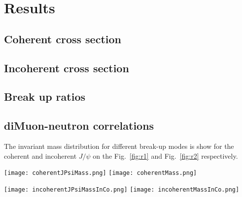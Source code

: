 \chapter{Results} 
  \section{Coherent cross section}
  \section{Incoherent cross section}
  \section{Break up ratios}
  \section{diMuon-neutron correlations}
The invariant mass distribution for different break-up modes is show for the coherent and incoherent $J/\psi$ on the Fig.~\ref{fig:r1} and Fig.~\ref{fig:r2} respectively. 
\begin{figure*}[!Hhtb]
  \begin{center}
    \texttt{[image: coherentJPsiMass.png]}
    \texttt{[image: coherentMass.png]}
    \caption{
      \label{fig:r1}  
      Invariant mass spectrum of the opposite signs di-muons originating from the coherent $J/\psi$ for $X_{n}0_{n}$ breakup mode for two invariant mass regions.  
    }
  \end{center}
\end{figure*}

\begin{figure*}[!Hhtb]
  \begin{center}
    \texttt{[image: incoherentJPsiMassInCo.png]}
        \texttt{[image: incoherentMassInCo.png]}


             \caption{
    \label{fig:r2}  
     Invariant mass spectrum of the opposite signs di-muons originating from the incoherent $J/\psi$  for $X_{n}0_{n}$ breakup mode for two invariant mass regions.   
        }
     
  \end{center}
\end{figure*}


